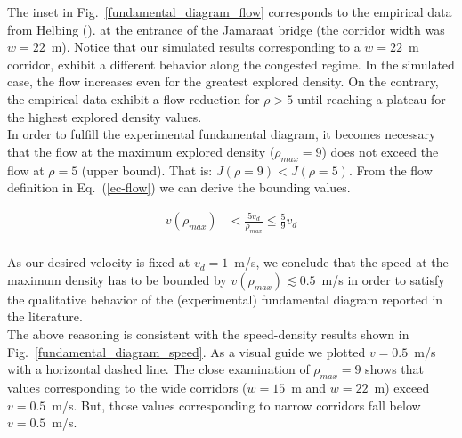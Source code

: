 The inset in Fig.~\ref{fundamental_diagram_flow} corresponds to the empirical data from Helbing (\cite{helbing3}). at the entrance of the Jamaraat bridge (the corridor width was $w=22$~m). Notice that our simulated results corresponding to a $w=22$~m corridor, exhibit a different behavior along the congested regime. In the simulated case, the flow increases even for the greatest explored density. On the contrary, the empirical data exhibit a flow reduction for $\rho > 5$ until reaching a plateau for the highest explored density values.  \\

In order to fulfill the experimental fundamental diagram, it becomes necessary that the flow at the maximum explored density ($\rho_{max} = 9$) does not exceed the flow at $\rho = 5$ (upper bound). That is:  $J(\rho = 9) < J(\rho = 5)$. From the flow definition in Eq.~(\ref{ec-flow}) we can derive the bounding values.

\begin{align*} 
v(\rho_{max}) &< \frac{5v_d}{\rho_{max}} \leq \frac{5}{9} v_d \\
\end{align*}

As our desired velocity is fixed at $v_d = 1$~m/s, we conclude that the speed at the maximum density has to be bounded by $v(\rho_{max}) \lesssim  0.5$~m/s in order to satisfy the qualitative behavior of the (experimental) fundamental diagram reported in the literature.\\

The above reasoning is consistent with the speed-density results shown in Fig.~\ref{fundamental_diagram_speed}. As a visual guide we plotted $v=0.5$~m/s with a horizontal dashed line. The close examination of $\rho_{max} = 9$ shows that values corresponding to the wide corridors ($w=15$~m and $w=22$~m) exceed $v=0.5$~m/s. But, those values corresponding to narrow corridors fall below $v=0.5$~m/s. \\

